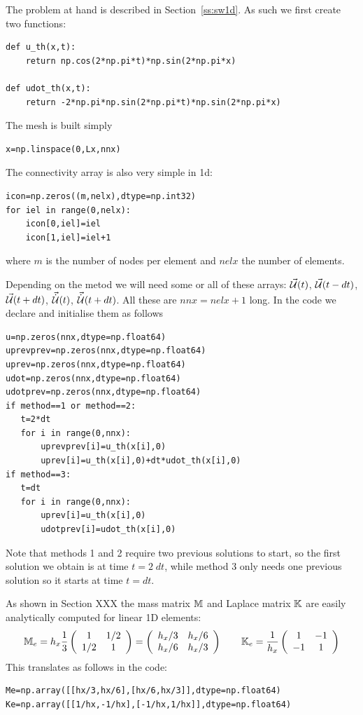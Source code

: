 The problem at hand is described in Section~\ref{ss:sw1d}.
As such we first create two functions:

\begin{lstlisting}
def u_th(x,t):
    return np.cos(2*np.pi*t)*np.sin(2*np.pi*x)

def udot_th(x,t):
    return -2*np.pi*np.sin(2*np.pi*t)*np.sin(2*np.pi*x)
\end{lstlisting}

The mesh is built simply
\begin{lstlisting}
x=np.linspace(0,Lx,nnx)
\end{lstlisting}
The connectivity array is also very simple in 1d:
\begin{lstlisting}
icon=np.zeros((m,nelx),dtype=np.int32)
for iel in range(0,nelx):
    icon[0,iel]=iel
    icon[1,iel]=iel+1
\end{lstlisting}
where $m$ is the number of nodes per element and $nelx$ the number of elements.

Depending on the metod we will need some or all of these arrays:
$\vec{\cal U}(t)$, $\vec{\cal U}(t-dt)$, $\vec{\cal U}(t+dt)$, $\vec{\dot{{\cal U}}}(t)$, $\vec{\dot{{\cal U}}}(t+dt)$.
All these are $nnx=nelx+1$ long. 
In the code we declare and initialise them as follows 
\begin{lstlisting}
u=np.zeros(nnx,dtype=np.float64)    
uprevprev=np.zeros(nnx,dtype=np.float64) 
uprev=np.zeros(nnx,dtype=np.float64)     
udot=np.zeros(nnx,dtype=np.float64)      
udotprev=np.zeros(nnx,dtype=np.float64) 
if method==1 or method==2:
   t=2*dt
   for i in range(0,nnx):
       uprevprev[i]=u_th(x[i],0)
       uprev[i]=u_th(x[i],0)+dt*udot_th(x[i],0)
if method==3:
   t=dt
   for i in range(0,nnx):
       uprev[i]=u_th(x[i],0)
       udotprev[i]=udot_th(x[i],0)
\end{lstlisting}

Note that methods 1 and 2 require two previous solutions to start, so
the first solution we obtain is at time $t=2\; dt$, while method 3
only needs one previous solution so it starts at time $t=dt$.


As shown in Section XXX the mass matrix ${\mathbb{M}}$ and Laplace matrix ${\mathbb{K}}$ are 
easily analytically computed for linear 1D elements:
\[
{\mathbb{M}}_e=
h_x\frac{1}{3}
\left(
\begin{array}{cc}
1 & 1/2 \\ 1/2 & 1
\end{array}
\right)
=
\left(
\begin{array}{cc}
h_x/3 & h_x/6 \\ h_x/6 & h_x/3
\end{array}
\right)
\qquad
{\mathbb{K}}_e=
\frac{1}{h_x}
\left(
\begin{array}{cc}
1 & -1 \\ -1 & 1
\end{array}
\right)
\]
This translates as follows in the code:
\begin{lstlisting}
Me=np.array([[hx/3,hx/6],[hx/6,hx/3]],dtype=np.float64)
Ke=np.array([[1/hx,-1/hx],[-1/hx,1/hx]],dtype=np.float64)
\end{lstlisting}

